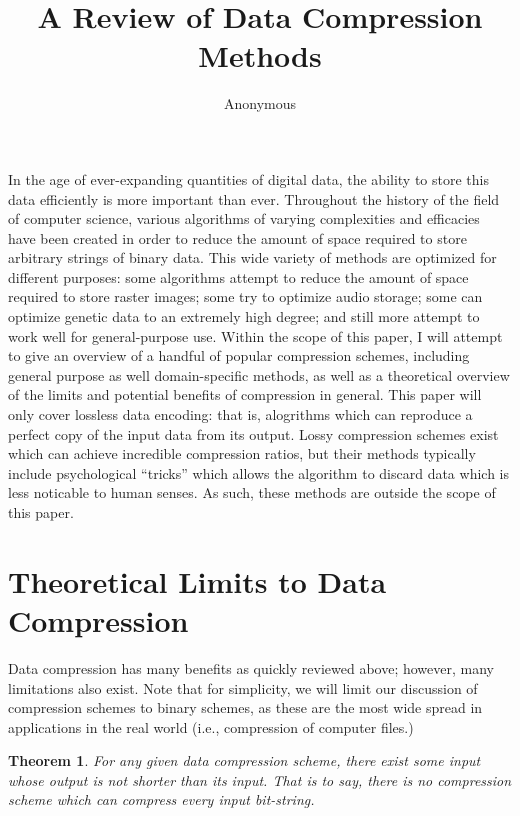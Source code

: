\documentclass[12pt]{article}
\title{A Review of Data Compression Methods}
\author{Anonymous}
\newtheorem{thm}{Theorem}[section]
\begin{document}
\maketitle

In the age of ever-expanding quantities of digital data, the ability
to store this data efficiently is more important than ever. Throughout
the history of the field of computer science, various algorithms of
varying complexities and efficacies have been created in order to
reduce the amount of space required to store arbitrary strings of
binary data. This wide variety of methods are optimized for different
purposes: some algorithms attempt to reduce the amount of space
required to store raster images; some try to optimize audio storage;
some can optimize genetic data to an extremely high degree; and still
more attempt to work well for general-purpose use. Within the scope of
this paper, I will attempt to give an overview of a handful of popular
compression schemes, including general purpose as well domain-specific
methods, as well as a theoretical overview of the limits and potential
benefits of compression in general. This paper will only cover
lossless data encoding: that is, alogrithms which can reproduce a
perfect copy of the input data from its output. Lossy compression
schemes exist which can achieve incredible compression ratios, but
their methods typically include psychological ``tricks'' which allows
the algorithm to discard data which is less noticable to human
senses. As such, these methods are outside the scope of this paper.

\section{Theoretical Limits to Data Compression}

Data compression has many benefits as quickly reviewed above; however,
many limitations also exist. Note that for simplicity, we will limit
our discussion of compression schemes to binary schemes, as these are
the most wide spread in applications in the real world (i.e.,
compression of computer files.)

\begin{thm}
  For any given data compression scheme, there exist some input
  whose output is not shorter than its input. That is to say, there is
  no compression scheme which can compress every input bit-string.
\end{thm}
\end{document}
